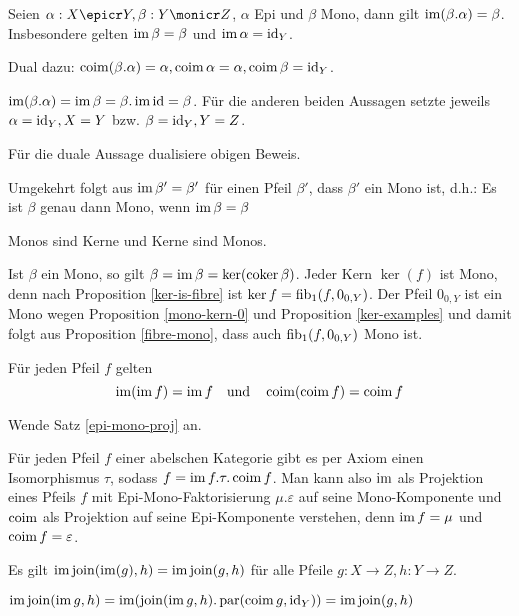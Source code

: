 \begin{korr}
Seien $\alpha : X \epicr Y, \beta : Y \monicr Z$, $\alpha$ Epi und $\beta$ Mono, dann gilt $\operatorname{im}(\beta.\alpha) = \beta$. Insbesondere gelten $\operatorname{im} \beta = \beta$ und $\operatorname{im} \alpha = \operatorname{id}_Y$.

Dual dazu: $\operatorname{coim}(\beta.\alpha) = \alpha, \operatorname{coim} \alpha = \alpha, \operatorname{coim} \beta = \operatorname{id}_Y$.
\end{korr}
\begin{bew}
$\operatorname{im}(\beta.\alpha) = \operatorname{im} \beta = \beta.\operatorname{im} \operatorname{id} = \beta$. Für die anderen beiden Aussagen setzte jeweils $\alpha = \operatorname{id}_Y, X=Y$ bzw. $\beta = \operatorname{id}_Y, Y=Z$.

Für die duale Aussage dualisiere obigen Beweis.
\end{bew}
\begin{bem}
Umgekehrt folgt aus $\operatorname{im}\beta' = \beta'$ für einen Pfeil $\beta'$, dass $\beta'$ ein Mono ist, d.h.:
Es ist $\beta$ genau dann Mono, wenn $\operatorname{im}\beta = \beta$
\end{bem}

\begin{korr}
Monos sind Kerne und Kerne sind Monos.
\end{korr}
\begin{bew}
Ist $\beta$ ein Mono, so gilt $\beta = \operatorname{im}\beta = \ker(\operatorname{coker}\beta)$.
Jeder Kern $\ker(f)$ ist Mono, denn nach Proposition \ref{ker-is-fibre} ist $\ker f = \operatorname{fib}_1(f,0_{0,Y})$.
Der Pfeil $0_{0,Y}$ ist ein Mono wegen Proposition \ref{mono-kern-0} und Proposition \ref{ker-examples} und damit folgt aus Proposition \ref{fibre-mono}, dass auch $\operatorname{fib}_1(f,0_{0,Y})$ Mono ist.
\end{bew}

\begin{korr}
Für jeden Pfeil $f$ gelten
\[ \operatorname{im}(\operatorname{im} f) = \operatorname{im} f \quad\text{und}\quad \operatorname{coim}(\operatorname{coim} f) = \operatorname{coim} f \]
\end{korr}
\begin{bew}
Wende Satz \ref{epi-mono-proj} an.
\end{bew}

\begin{bem}
Für jeden Pfeil $f$ einer abelschen Kategorie gibt es per Axiom einen Isomorphismus $\tau$, sodass $f = \operatorname{im} f.\tau.\operatorname{coim} f$.
Man kann also $\operatorname{im}$ als Projektion eines Pfeils $f$ mit Epi-Mono-Faktorisierung $\mu.\varepsilon$ auf seine Mono-Komponente und $\operatorname{coim}$ als Projektion auf seine Epi-Komponente verstehen, denn $\operatorname{im} f = \mu$ und $\operatorname{coim} f = \varepsilon$.

\end{bem}

\begin{prop} \label{im-join-im-elim}
Es gilt $\operatorname{im}\operatorname{join}(\operatorname{im}(g),h) = \operatorname{im}\operatorname{join}(g,h)$ für alle Pfeile $g:X\to Z,h : Y\to Z$.
\end{prop}
\begin{bew}
$\operatorname{im}\operatorname{join}(\operatorname{im} g,h) = \operatorname{im}(\operatorname{join}(\operatorname{im} g,h).\operatorname{par}(\operatorname{coim} g,\operatorname{id}_Y)) = \operatorname{im}\operatorname{join}(g,h)$
\end{bew}
